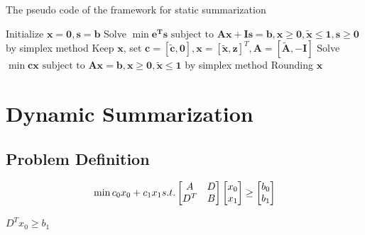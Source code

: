 \documentclass{llncs}
\begin{document}
\begin{algorithm}\label{alg:framework}
\caption{The pseudo code of the framework for static summarization}

Initialize $\mathbf{x}=\mathbf{0},\mathbf{s}=\mathbf{b}$\;
Solve $\min \mathbf{e^{T}s} \textrm{ subject to } \mathbf{Ax} + \mathbf{Is} = \mathbf{b}, \mathbf{x}\geq \mathbf{0},\tilde{\mathbf{x}} \leq \mathbf{1},\mathbf{s}\geq \mathbf{0}$ by simplex method\;
Keep $\mathbf{x}$, set $\mathbf{c}=[\tilde{\mathbf{c}},\mathbf{0}],\mathbf{x}=[\tilde{\mathbf{x}},\mathbf{z}]^T,\mathbf{A}=[\tilde{\mathbf{A}},-\mathbf{I}]$ \;
Solve $\min \mathbf{cx} \textrm{ subject to } \mathbf{Ax} = \mathbf{b}, \mathbf{x}\geq \mathbf{0},\tilde{\mathbf{x}} \leq \mathbf{1}$ by simplex method\;
Rounding $\mathbf{x}$\;
\end{algorithm}



\section{Dynamic Summarization}\label{sec:dynamic}

\subsection{Problem Definition}
\begin{equation}
\min c_0x_0+c_1x_1\\
s.t. \begin{bmatrix}
A & D \\
D^T & B
\end{bmatrix}\begin{bmatrix}
 x_0\\
x_1
\end{bmatrix}\geq \begin{bmatrix}
b_0\\
b_1
\end{bmatrix}
\end{equation}

$D^Tx_0\geq b_1$




\end{document}
